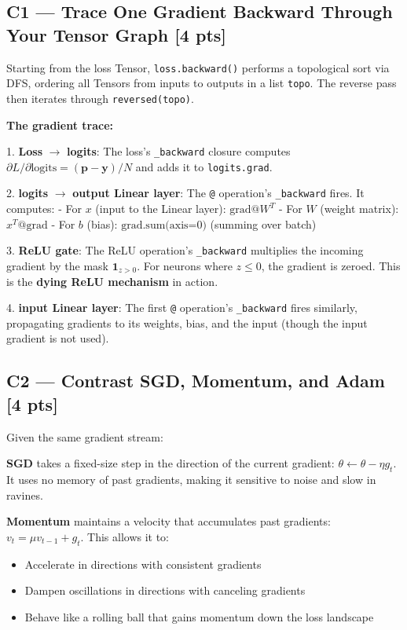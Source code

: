 \documentclass[11pt,a4paper]{article}
\begin{document}
\subsection*{C1 --- Trace One Gradient Backward Through Your Tensor Graph \hfill [4 pts]}

Starting from the loss Tensor, \texttt{loss.backward()} performs a topological sort via DFS, ordering all Tensors from inputs to outputs in a list \texttt{topo}. The reverse pass then iterates through \texttt{reversed(topo)}.

\textbf{The gradient trace:}

1. \textbf{Loss} $\to$ \textbf{logits}: The loss's \texttt{\_backward} closure computes $\partial L/\partial\text{logits} = (\mathbf{p} - \mathbf{y})/N$ and adds it to \texttt{logits.grad}.

2. \textbf{logits} $\to$ \textbf{output Linear layer}: The \texttt{@} operation's \texttt{\_backward} fires. It computes:
   - For $x$ (input to the Linear layer): $\text{grad} @ W^T$
   - For $W$ (weight matrix): $x^T @ \text{grad}$
   - For $b$ (bias): $\text{grad}.\text{sum(axis=0)}$ (summing over batch)

3. \textbf{ReLU gate}: The ReLU operation's \texttt{\_backward} multiplies the incoming gradient by the mask $\mathbf{1}_{z > 0}$. For neurons where $z \leq 0$, the gradient is zeroed. This is the \textbf{dying ReLU mechanism} in action.

4. \textbf{input Linear layer}: The first \texttt{@} operation's \texttt{\_backward} fires similarly, propagating gradients to its weights, bias, and the input (though the input gradient is not used).

\subsection*{C2 --- Contrast SGD, Momentum, and Adam \hfill [4 pts]}

Given the same gradient stream:

\textbf{SGD} takes a fixed-size step in the direction of the current gradient: $\theta \leftarrow \theta - \eta g_t$. It uses no memory of past gradients, making it sensitive to noise and slow in ravines.

\textbf{Momentum} maintains a velocity that accumulates past gradients: $v_t = \mu v_{t-1} + g_t$. This allows it to:
\begin{itemize}
    \item Accelerate in directions with consistent gradients
    \item Dampen oscillations in directions with canceling gradients    \item Behave like a rolling ball that gains momentum down the loss landscape
\end{itemize}
\end{document}

